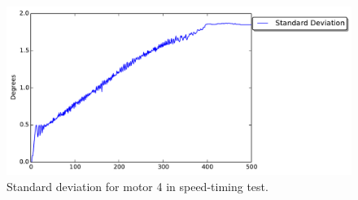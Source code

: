 \begin{figure}[ht]
\includegraphics[width=\textwidth]{test_res/speed_tests/StandardDeviation_motor_4.pdf}
\caption{Standard deviation for motor 4 in speed-timing test.}
\label{fig:stand_4}
\end{figure}

\FloatBarrier